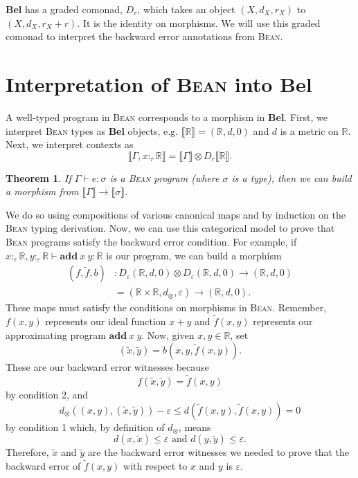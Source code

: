 \documentclass[a4paper]{article}
\newcommand{\Bel}{\textbf{Bel}}
\newcommand{\Bean}{\textsc{Bean}}
\newcommand{\denot}[1]{\llbracket {#1} \rrbracket}
\newcommand{\R}{\mathbb{R}}
\newcommand{\add}[2]{\textbf{add}\ {#1}\ {#2}}
\newtheorem{theorem}{Theorem}
\begin{document}
\Bel{} has a graded comonad, $D_r$, which takes an object $(X,d_X,r_X)$ to $(X,d_X,r_X+r)$. It is the identity on morphisms. We will use this graded comonad to interpret the backward error annotations from \Bean{}.

\section{Interpretation of \Bean{} into \Bel{}}
A well-typed program in \Bean{} corresponds to a morphism in \Bel{}. First, we interpret \Bean{} types as \Bel{} objects, e.g. $\denot{\R}=(\R,d,0)$ and $d$ is a metric on $\R$. Next, we interpret contexts as 
\begin{equation*}
    \denot{\Gamma,x:_r\R}=\denot\Gamma\otimes D_r\denot\R.
\end{equation*}

\begin{theorem}
    If $\Gamma\vdash e:\sigma$ is a \Bean{} program (where $\sigma$ is a type), then we can build a morphism from $\denot\Gamma\to\denot\sigma$.
\end{theorem} 
We do so using compositions of various canonical maps and by induction on the \Bean{} typing derivation. Now, we can use this categorical model to prove that \Bean{} programs satisfy the backward error condition. For example, if $x:_\varepsilon\R,y:_\varepsilon\R\vdash \add{x}{y}:\R$ is our program, we can build a morphism
\begin{align*}
    (f,\tilde{f},b)&:D_\varepsilon(\R,d,0)\otimes D_\varepsilon(\R,d,0)\to (\R,d,0) \\
    &=(\R\times\R,d_\otimes,\varepsilon)\to (\R,d,0).
\end{align*}
These maps must satisfy the conditions on morphisms in \Bean. Remember, $f(x,y)$ represents our ideal function $x+y$ and $\tilde{f}(x,y)$ represents our approximating program $\add{x}{y}$. Now, given $x,y\in\R$, set 
\begin{equation*}
    (\tilde{x},\tilde{y})=b(x,y,\tilde{f}(x,y)).
\end{equation*}
These are our backward error witnesses because 
\begin{equation*}
    f(\tilde{x},\tilde{y})=\tilde{f}(x,y)
\end{equation*}
by condition 2, and 
\begin{equation*}
    d_\otimes((x,y),(\tilde{x},\tilde{y}))-\varepsilon\leq d(\tilde{f}(x,y),\tilde{f}(x,y))=0
\end{equation*}
by condition 1 which, by definition of $d_\otimes$, means 
\begin{equation*}
    d(x,\tilde{x})\leq \varepsilon\text{ and }d(y,\tilde{y})\leq \varepsilon.
\end{equation*}
Therefore, $\tilde{x}$ and $\tilde{y}$ are the backward error witnesses we needed to prove that the backward error of $\tilde{f}(x,y)$ with respect to $x$ and $y$ is $\varepsilon$.
\end{document}
